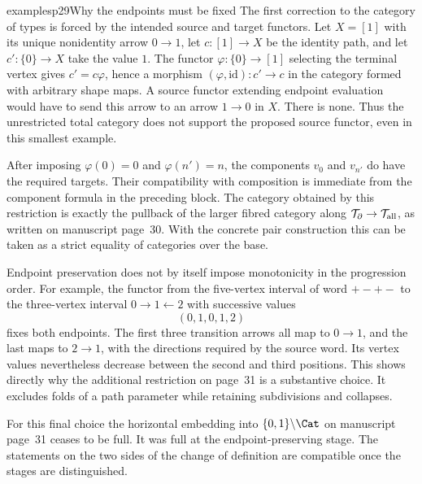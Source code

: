\begin{dcomment}{examples}{p29}{Why the endpoints must be fixed}
The first correction to the category of types is forced by the intended source and target functors. Let $X=[1]$ with its unique nonidentity arrow $0\to1$, let $c:[1]\to X$ be the identity path, and let $c':\{0\}\to X$ take the value $1$. The functor $\varphi:\{0\}\to[1]$ selecting the terminal vertex gives $c'=c\varphi$, hence a morphism $(\varphi,\mathrm{id}):c'\to c$ in the category formed with arbitrary shape maps. A source functor extending endpoint evaluation would have to send this arrow to an arrow $1\to0$ in $X$. There is none. Thus the unrestricted total category does not support the proposed source functor, even in this smallest example.

After imposing $\varphi(0)=0$ and $\varphi(n')=n$, the components $v_0$ and $v_{n'}$ do have the required targets. Their compatibility with composition is immediate from the component formula in the preceding block. The category obtained by this restriction is exactly the pullback of the larger fibred category along $\mathcal T_{\partial}\to\mathcal T_{\rm all}$, as written on manuscript page~30. With the concrete pair construction this can be taken as a strict equality of categories over the base.

Endpoint preservation does not by itself impose monotonicity in the progression order. For example, the functor from the five-vertex interval of word $+-+-$ to the three-vertex interval $0\to1\leftarrow2$ with successive values
\[
  (0,1,0,1,2)
\]
fixes both endpoints. The first three transition arrows all map to $0\to1$, and the last maps to $2\to1$, with the directions required by the source word. Its vertex values nevertheless decrease between the second and third positions. This shows directly why the additional restriction on page~31 is a substantive choice. It excludes folds of a path parameter while retaining subdivisions and collapses.

For this final choice the horizontal embedding into $\{0,1\}\backslash\Cat$ on manuscript page~31 ceases to be full. It was full at the endpoint-preserving stage. The statements on the two sides of the change of definition are compatible once the stages are distinguished.
\end{dcomment}

